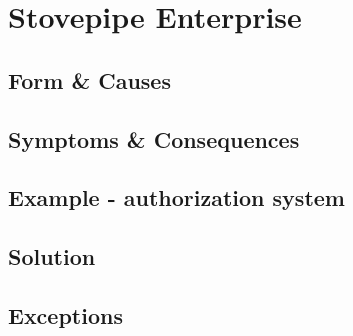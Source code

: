 \section{Stovepipe Enterprise}

\subsection{Form \& Causes}

\subsection{Symptoms \& Consequences}

\subsection{Example - authorization system}

\subsection{Solution}

\subsection{Exceptions}